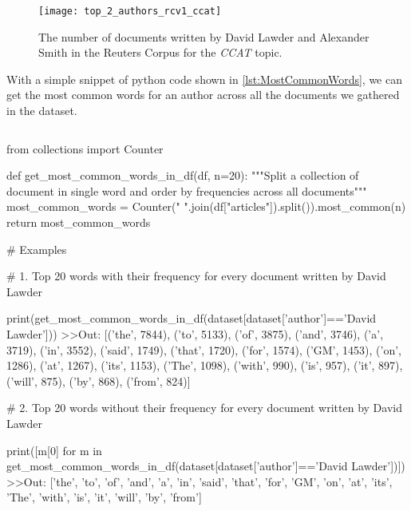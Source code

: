 \begin{figure}[ht]
	\centering
	\texttt{[image: top\_2\_authors\_rcv1\_ccat]}
	\caption[Number of documents for 2 authors in Reuters Corpus]{The number of documents written by David Lawder and Alexander Smith in the Reuters Corpus for the \textit{CCAT} topic.}
	\label{fig:chartRCV1Top2Authors}
\end{figure}

With a simple snippet of python code shown in \ref{lst:MostCommonWords}, we can get the most common words for an author across all the documents we gathered in the dataset.

\begin{lstlisting}[frame=none,caption={Top 20 most common words in a document or a collection of document by the same author.},captionpos=b,label=lst:MostCommonWords]
\end{lstlisting}
\begin{python}
	from collections import Counter
	
	def get_most_common_words_in_df(df, n=20):
		"""Split a collection of document in single word and order by frequencies across all documents"""
		most_common_words = Counter(" ".join(df["articles"]).split()).most_common(n)
		return most_common_words
\end{python}
\begin{python}	
	# Examples
	
	# 1. Top 20 words with their frequency for every document written by David Lawder
	
	print(get_most_common_words_in_df(dataset[dataset['author']=='David Lawder']))
	>>Out: [('the', 7844), ('to', 5133), ('of', 3875), ('and', 3746), ('a', 3719), ('in', 3552), ('said', 1749), ('that', 1720), ('for', 1574), ('GM', 1453), ('on', 1286), ('at', 1267), ('its', 1153), ('The', 1098), ('with', 990), ('is', 957), ('it', 897), ('will', 875), ('by', 868), ('from', 824)]
	
	# 2. Top 20 words without their frequency for every document written by David Lawder
	
	print([m[0] for m in get_most_common_words_in_df(dataset[dataset['author']=='David Lawder'])])
	>>Out: ['the',
			'to',
			'of',
			'and',
			'a',
			'in',
			'said',
			'that',
			'for',
			'GM',
			'on',
			'at',
			'its',
			'The',
			'with',
			'is',
			'it',
			'will',
			'by',
			'from']
	
\end{python}

